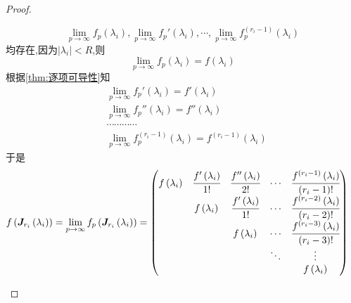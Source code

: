 {\begin{proof}
\begin{enumerate}[label=\arabic*)]
\[                      \lim_{p\to\infty}f_p\left(
                      \lambda_i
                      \right),\lim_{p\to\infty}f_p'\left(
                      \lambda_i
                      \right),\cdots,\lim_{p\to\infty}f_p^{\left(r_i-1\right)}\left(
                      \lambda_i
                      \right)
                  \]均存在,因为$\left|\lambda_i\right|<R$,则\[
                      \lim_{p\to\infty}f_p\left(\lambda_i\right)=f\left(\lambda_i\right)
                  \]根据\cref{thm:逐项可导性}知\begin{align*}
                       & \lim_{p\to\infty}f_p'\left(\lambda_i\right)=f'\left(\lambda_i\right)                                         \\
                       & \lim_{p\to\infty}f_p''\left(\lambda_i\right)=f''\left(\lambda_i\right)                                       \\
                       & \cdots\cdots\cdots\cdots                                                                                     \\
                       & \lim_{p\to\infty}f_p^{\left(r_i-1\right)}\left(\lambda_i\right)=f^{\left(r_i-1\right)}\left(\lambda_i\right)
                  \end{align*}于是\begin{align*}
                      f\left(
                      \bm{J}_{r_i}\left(\lambda_i\right)
                      \right)=\lim_{p\to\infty}f_p\left(
                      \bm{J}_{r_i}\left(\lambda_i\right)
                      \right) & =\begin{pmatrix}
                                     f\left(\lambda_i\right) & \cfrac{f'\left(\lambda_i\right)}{1!} & \cfrac{f''\left(\lambda_i\right)}{2!} & \cdots & \cfrac{f^{\left(r_i-1\right)}\left(\lambda_i\right)}{\left(r_i-1\right)!} \\
                                                             & f\left(\lambda_i\right)              & \cfrac{f'\left(\lambda_i\right)}{1!}  & \cdots & \cfrac{f^{\left(r_i-2\right)}\left(\lambda_i\right)}{\left(r_i-2\right)!} \\
                                                             &                                      & f\left(\lambda_i\right)               & \cdots & \cfrac{f^{\left(r_i-3\right)}\left(\lambda_i\right)}{\left(r_i-3\right)!} \\
                                                             &                                      &                                       & \ddots & \vdots                                                                    \\
                                                             &                                      &                                       &        & f\left(\lambda_i\right)
                                 \end{pmatrix}\qedhere
                  \end{align*}
        \end{enumerate}
    \end{proof}
}
